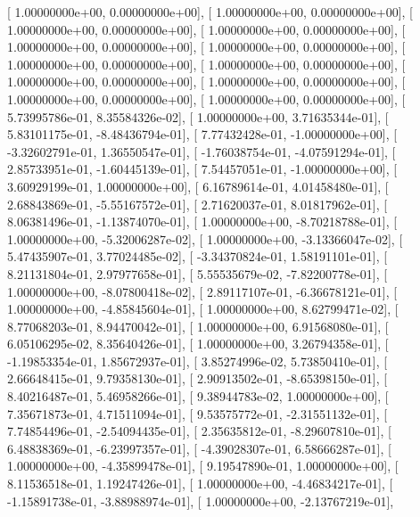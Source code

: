 \documentclass{article}
\begin{document}
       [  1.00000000e+00,   0.00000000e+00],
       [  1.00000000e+00,   0.00000000e+00],
       [  1.00000000e+00,   0.00000000e+00],
       [  1.00000000e+00,   0.00000000e+00],
       [  1.00000000e+00,   0.00000000e+00],
       [  1.00000000e+00,   0.00000000e+00],
       [  1.00000000e+00,   0.00000000e+00],
       [  1.00000000e+00,   0.00000000e+00],
       [  1.00000000e+00,   0.00000000e+00],
       [  1.00000000e+00,   0.00000000e+00],
       [  1.00000000e+00,   0.00000000e+00],
       [  1.00000000e+00,   0.00000000e+00],
       [  5.73995786e-01,   8.35584326e-02],
       [  1.00000000e+00,   3.71635344e-01],
       [  5.83101175e-01,  -8.48436794e-01],
       [  7.77432428e-01,  -1.00000000e+00],
       [ -3.32602791e-01,   1.36550547e-01],
       [ -1.76038754e-01,  -4.07591294e-01],
       [  2.85733951e-01,  -1.60445139e-01],
       [  7.54457051e-01,  -1.00000000e+00],
       [  3.60929199e-01,   1.00000000e+00],
       [  6.16789614e-01,   4.01458480e-01],
       [  2.68843869e-01,  -5.55167572e-01],
       [  2.71620037e-01,   8.01817962e-01],
       [  8.06381496e-01,  -1.13874070e-01],
       [  1.00000000e+00,  -8.70218788e-01],
       [  1.00000000e+00,  -5.32006287e-02],
       [  1.00000000e+00,  -3.13366047e-02],
       [  5.47435907e-01,   3.77024485e-02],
       [ -3.34370824e-01,   1.58191101e-01],
       [  8.21131804e-01,   2.97977658e-01],
       [  5.55535679e-02,  -7.82200778e-01],
       [  1.00000000e+00,  -8.07800418e-02],
       [  2.89117107e-01,  -6.36678121e-01],
       [  1.00000000e+00,  -4.85845604e-01],
       [  1.00000000e+00,   8.62799471e-02],
       [  8.77068203e-01,   8.94470042e-01],
       [  1.00000000e+00,   6.91568080e-01],
       [  6.05106295e-02,   8.35640426e-01],
       [  1.00000000e+00,   3.26794358e-01],
       [ -1.19853354e-01,   1.85672937e-01],
       [  3.85274996e-02,   5.73850410e-01],
       [  2.66648415e-01,   9.79358130e-01],
       [  2.90913502e-01,  -8.65398150e-01],
       [  8.40216487e-01,   5.46958266e-01],
       [  9.38944783e-02,   1.00000000e+00],
       [  7.35671873e-01,   4.71511094e-01],
       [  9.53575772e-01,  -2.31551132e-01],
       [  7.74854496e-01,  -2.54094435e-01],
       [  2.35635812e-01,  -8.29607810e-01],
       [  6.48838369e-01,  -6.23997357e-01],
       [ -4.39028307e-01,   6.58666287e-01],
       [  1.00000000e+00,  -4.35899478e-01],
       [  9.19547890e-01,   1.00000000e+00],
       [  8.11536518e-01,   1.19247426e-01],
       [  1.00000000e+00,  -4.46834217e-01],
       [ -1.15891738e-01,  -3.88988974e-01],
       [  1.00000000e+00,  -2.13767219e-01],
\end{document}
